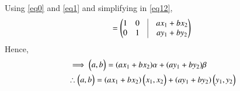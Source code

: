 \documentclass[journal,12pt,twocolumn]{IEEEtran}
\begin{document}
Using \ref{eq0} and \ref{eq1} and simplifying in \ref{eq12},
\begin{align}
=\myvec{1&0&\vrule&ax_1+bx_2\\0&1&\vrule&ay_1+by_2}
\end{align}
Hence,
\begin{align}
&\implies \begin{pmatrix}a,b\end{pmatrix}=(ax_1+bx_2)\mathbf{\alpha}+(ay_1+by_2)\mathbf{\beta}\\
&\therefore \begin{pmatrix}a,b\end{pmatrix}=(ax_1+bx_2)\begin{pmatrix}x_1,x_2\end{pmatrix}+(ay_1+by_2)\begin{pmatrix}y_1,y_2\end{pmatrix}
\end{align}
\end{document}
